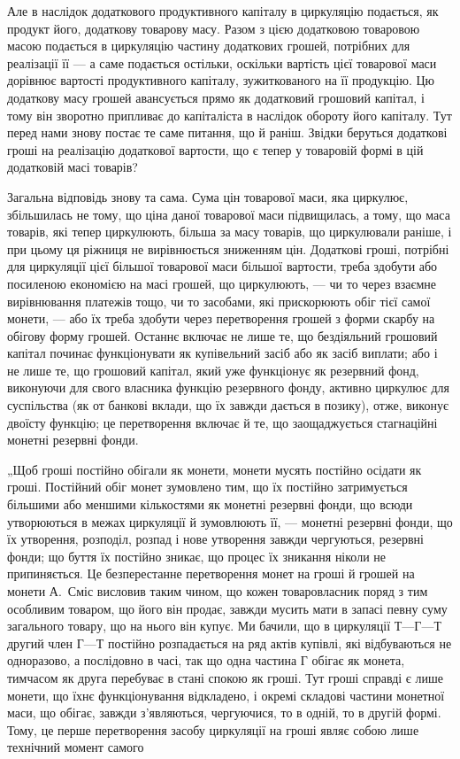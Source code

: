 
Але в наслідок додаткового продуктивного капіталу в циркуляцію
подається, як продукт його, додаткову товарову масу. Разом з цією
додатковою товаровою масою подається в циркуляцію частину додаткових
грошей, потрібних для реалізації її — а саме подається остільки, оскільки
вартість цієї товарової маси дорівнює вартості продуктивного капіталу,
зужиткованого на її продукцію. Цю додаткову масу грошей авансується
прямо як додатковий грошовий капітал, і тому він зворотно припливає
до капіталіста в наслідок обороту його капіталу. Тут перед нами знову
постає те саме питання, що й раніш. Звідки беруться додаткові гроші на
реалізацію додаткової вартости, що є тепер у товаровій формі в цій
додатковій масі товарів?

Загальна відповідь знову та сама. Сума цін товарової маси, яка циркулює,
збільшилась не тому, що ціна даної товарової маси підвищилась,
а тому, що маса товарів, які тепер циркулюють, більша за масу товарів,
що циркулювали раніше, і при цьому ця ріжниця не вирівнюється зниженням
цін. Додаткові гроші, потрібні для циркуляції цієї більшої товарової
маси більшої вартости, треба здобути або посиленою економією на
масі грошей, що циркулюють, — чи то через взаємне вирівнювання платежів
тощо, чи то засобами, які прискорюють обіг тієї самої монети, —
або їх треба здобути через перетворення грошей з форми скарбу на
обігову форму грошей. Останнє включає не лише те, що бездіяльний
грошовий капітал починає функціонувати як купівельний засіб
або як засіб виплати; або і не лише те, що грошовий капітал, який уже
функціонує як резервний фонд, виконуючи для свого власника функцію
резервного фонду, активно циркулює для суспільства (як от банкові
вклади, що їх завжди дається в позику), отже, виконує двоїсту функцію;
це перетворення включає й те, що заощаджується стагнаційні монетні
резервні фонди.

„Щоб гроші постійно обігали як монети, монети мусять постійно
осідати як гроші. Постійний обіг монет зумовлено тим, що їх постійно
затримується більшими або меншими кількостями як монетні резервні
фонди, що всюди утворюються в межах циркуляції й зумовлюють її, —
монетні резервні фонди, що їх утворення, розподіл, розпад і нове утворення
завжди чергуються, резервні фонди; що буття їх постійно зникає,
що процес їх зникання ніколи не припиняється. Це безперестанне перетворення
монет на гроші й грошей на монети А.~Сміс висловив таким
чином, що кожен товаровласник поряд з тим особливим товаром, що
його він продає, завжди мусить мати в запасі певну суму загального
товару, що на нього він купує. Ми бачили, що в циркуляції $Т — Г — Т$
другий член $Г — Т$ постійно розпадається на ряд актів купівлі, які відбуваються
не одноразово, а послідовно в часі, так що одна частина $Г$
обігає як монета, тимчасом як друга перебуває в стані спокою як гроші.
Тут гроші справді є лише монети, що їхнє функціонування відкладено,
і окремі складові частини монетної маси, що обігає, завжди з’являються,
чергуючися, то в одній, то в другій формі. Тому, це перше перетворення
засобу циркуляції на гроші являє собою лише технічний момент самого
\parbreak{}  %
